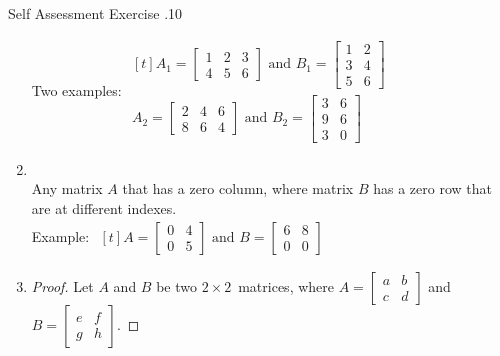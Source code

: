 \documentclass[../notes.tex]{subfiles}
\begin{document}
\begin{exercise}{Self Assessment Exercise \thechapter.10}
\begin{enumerate}
							Two examples: \quad
							$ \begin{aligned}[t]
								A_{1} = \begin{bmatrix}
									1 & 2 & 3\\
									4 & 5 & 6
								\end{bmatrix} \text{ and }
								B_{1} = \begin{bmatrix}
									1 & 2\\
									3 & 4\\
									5 & 6
								\end{bmatrix}\\
								A_{2} = \begin{bmatrix}
									2 & 4 & 6\\
									8 & 6 & 4
								\end{bmatrix} \text{ and }
								B_{2} = \begin{bmatrix}
									3 & 6\\
									9 & 6\\
									3 & 0
								\end{bmatrix}
							\end{aligned} $
						\item {}\\
							Any matrix $A$ that has a zero column, where matrix $B$ has a zero row that are at different indexes.\\
							Example: \quad $
							\begin{aligned}[t]
								A = \begin{bmatrix}
									0 & 4\\
									0 & 5
								\end{bmatrix} \text{ and }
								B = \begin{bmatrix}
									6 & 8\\
									0 & 0
								\end{bmatrix}
							\end{aligned}$
						\pagebreak
						\item {}
							\begin{proof}
								Let $A$ and $B$ be two $2 \times 2$~matrices, where $A = \begin{bmatrix}a & b\\ c & d\end{bmatrix}$ and $B = \begin{bmatrix}e & f\\g & h\end{bmatrix}$.

\end{proof}
\end{enumerate}
\end{exercise}
\end{document}
